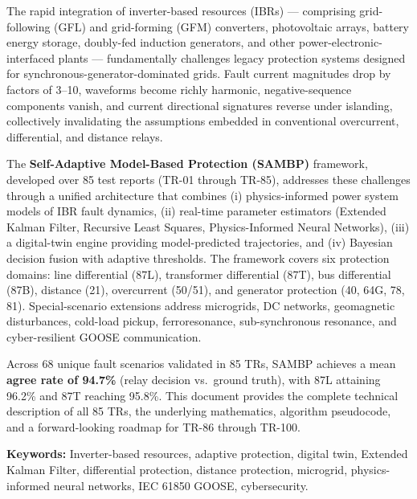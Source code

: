 \documentclass[11pt,a4paper]{report}
\newcommand{\sambp}{\textsc{SAMBP}}
\newcommand{\ibr}{\textsc{IBR}}
\begin{document}
The rapid integration of inverter-based resources (\ibr{}s) — comprising grid-following (GFL) and grid-forming (GFM) converters, photovoltaic arrays, battery energy storage, doubly-fed induction generators, and other power-electronic-interfaced plants — fundamentally challenges legacy protection systems designed for synchronous-generator-dominated grids. Fault current magnitudes drop by factors of 3--10, waveforms become richly harmonic, negative-sequence components vanish, and current directional signatures reverse under islanding, collectively invalidating the assumptions embedded in conventional overcurrent, differential, and distance relays.

The \textbf{Self-Adaptive Model-Based Protection (\sambp{})} framework, developed over 85 test reports (TR-01 through TR-85), addresses these challenges through a unified architecture that combines (i) physics-informed power system models of \ibr{} fault dynamics, (ii) real-time parameter estimators (Extended Kalman Filter, Recursive Least Squares, Physics-Informed Neural Networks), (iii) a digital-twin engine providing model-predicted trajectories, and (iv) Bayesian decision fusion with adaptive thresholds. The framework covers six protection domains: line differential (87L), transformer differential (87T), bus differential (87B), distance (21), overcurrent (50/51), and generator protection (40, 64G, 78, 81). Special-scenario extensions address microgrids, DC networks, geomagnetic disturbances, cold-load pickup, ferroresonance, sub-synchronous resonance, and cyber-resilient GOOSE communication.

Across 68 unique fault scenarios validated in 85 TRs, \sambp{} achieves a mean \textbf{agree rate of 94.7\%} (relay decision vs.\ ground truth), with 87L attaining 96.2\% and 87T reaching 95.8\%. This document provides the complete technical description of all 85 TRs, the underlying mathematics, algorithm pseudocode, and a forward-looking roadmap for TR-86 through TR-100.

\vspace{0.5cm}
\noindent\textbf{Keywords:} Inverter-based resources, adaptive protection, digital twin, Extended Kalman Filter, differential protection, distance protection, microgrid, physics-informed neural networks, IEC 61850 GOOSE, cybersecurity.

\tableofcontents
\listoffigures
\listoftables

\end{document}
